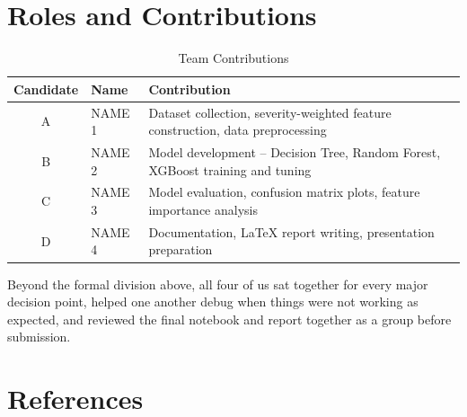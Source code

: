 \documentclass[12pt,a4paper]{article}
\begin{document}
\section{Roles and Contributions}

\begin{table}[H]
\centering
\caption{Team Contributions}
\small
\begin{tabular}{|c|p{3.5cm}|p{7.8cm}|}
\hline
\textbf{Candidate} & \textbf{Name} & \textbf{Contribution} \\
\hline
A & NAME 1 & Dataset collection, severity-weighted feature construction, data preprocessing \\
\hline
B & NAME 2 & Model development -- Decision Tree, Random Forest, XGBoost training and tuning \\
\hline
C & NAME 3 & Model evaluation, confusion matrix plots, feature importance analysis \\
\hline
D & NAME 4 & Documentation, LaTeX report writing, presentation preparation \\
\hline
\end{tabular}
\end{table}

\vspace{0.4cm}
Beyond the formal division above, all four of us sat together for every major decision point, helped one another debug when things were not working as expected, and reviewed the final notebook and report together as a group before submission.

\section{References}
\end{document}
